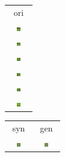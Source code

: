 \documentclass[letter]{article}
\begin{document}
\newpage

\begin{table}[h!]
	\centering
	\begin{tabular}{c}
		ori\tabularnewline
		\includegraphics[width=0.17\textwidth]{../data/ivy2/512/1} \tabularnewline		\includegraphics[width=0.17\textwidth]{../data/ivy2/512/2} \tabularnewline		\includegraphics[width=0.17\textwidth]{../data/ivy2/512/3} \tabularnewline		\includegraphics[width=0.17\textwidth]{../data/ivy2/512/4} \tabularnewline		\includegraphics[width=0.17\textwidth]{../data/ivy2/512/5} \tabularnewline		\includegraphics[width=0.17\textwidth]{../data/ivy2/512/6} \tabularnewline
	\end{tabular}
	\begin{tabular}{cc}
		syn & gen\tabularnewline
		\includegraphics[width=0.17\textwidth]{../output/ims_syn/ivy2/512_2/syn_im1} & \includegraphics[width=0.17\textwidth]{../output/ims_gen/ivy2/512_2/gen_im1} \tabularnewline

\end{tabular}
\end{table}
\end{document}

